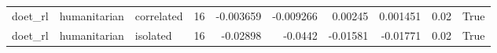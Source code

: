 \begin{table}
\begin{tabular}{lllrrrrrrl}
  doet\_rl & humanitarian &              correlated &               16 &                  -0.003659 &                      -0.009266 &                         0.00245 &                           0.001451 &                   0.02 &         True \\
  doet\_rl & humanitarian &                isolated &               16 &                   -0.02898 &                        -0.0442 &                        -0.01581 &                           -0.01771 &                   0.02 &         True \\
\bottomrule
\end{tabular}
\end{table}
